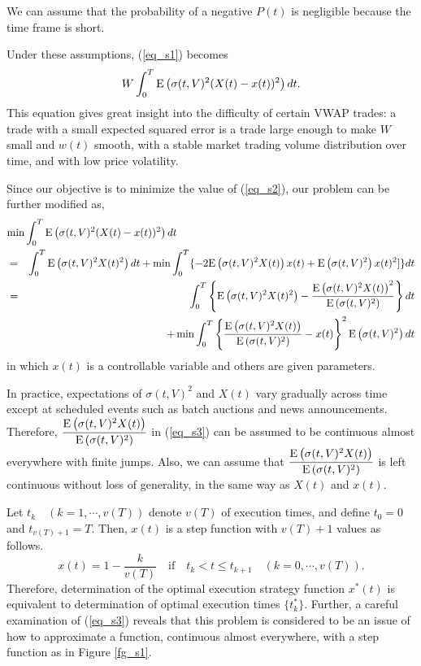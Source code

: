  We can assume that the probability of a negative $P(t)$ is negligible because the time frame is short.

Under these assumptions, (\ref{eq_s1}) becomes
\begin{equation}\label{eq_s2}
  W \int_0^T {\mathrm{E}}\left( \sigma(t,V)^2(X(t)-x(t))^2 \right) dt.
\end{equation}
This equation gives great insight into the difficulty of certain VWAP trades: a trade with a small expected squared error is a trade large enough to make $W$ small and $w(t)$ smooth, with a stable market trading volume distribution over time, and with low price volatility.

Since our objective is to minimize the value of (\ref{eq_s2}), our problem can be further modified as,
\begin{eqnarray}
    \lefteqn{\mbox{min} \int_0^T \ex{\sigma(t,V)^2(X(t)-x(t))^2} dt} \nonumber \\
    & = & \int_0^T \ex{\sigma(t,V)^2X(t)^2}dt+ \min\int_0^T \{-2\ex{\sigma(t,V)^2X(t)}x(t)+ \ex{\sigma(t,V)^2}x(t)^2]\}dt \nonumber \\
    & = & \int_0^T \left\{ \ex{\sigma(t,V)^2X(t)^2}-\frac{\ex{\sigma(t,V)^2X(t)}^2}{\ex{\sigma(t,V)^2}} \right\} dt \nonumber \\
    &   & + \min \int_0^T \left\{ \frac{\ex{\sigma(t,V)^2X(t)}}{\ex{\sigma(t,V)^2}}-x(t)\right\}^2\ex{\sigma(t,V)^2} dt \label{eq_s3}
\end{eqnarray}
in which $x(t)$ is a controllable variable and others are given parameters.

In practice, expectations of $\sigma(t,V)^2$ and $X(t)$ vary gradually across time except at scheduled events such as batch auctions and news announcements.  Therefore, $\displaystyle \frac{{\mathrm{E}}\left( \sigma(t,V)^2X(t) \right)}{{\mathrm{E}}\left( \sigma(t,V)^2 \right)}$ in (\ref{eq_s3}) can be assumed to be continuous almost everywhere with finite jumps.  Also, we can assume that $\displaystyle \frac{{\mathrm{E}}\left( \sigma(t,V)^2X(t) \right)}{{\mathrm{E}}\left( \sigma(t,V)^2 \right)}$ is left continuous without loss of generality, in the same way as $X(t)$ and $x(t)$.

Let $t_k \quad (k=1,\cdots,v(T))$ denote $v(T)$ of execution times, and define $t_0=0$ and $t_{v(T)+1}=T$.  Then, $x(t)$ is a step function with $v(T)+1$ values as follows.
\begin{equation}\label{eq_s4}
  x(t)=1-\frac{k}{v(T)} \quad \mbox{if} \quad t_k < t \leq t_{k+1} \quad (k=0,\cdots,v(T)).
\end{equation}
Therefore, determination of the optimal execution strategy function $x^*(t)$ is equivalent to determination of optimal execution times $\{t_k^*\}$.  Further, a careful examination of (\ref{eq_s3}) reveals that this problem is considered to be an issue of how to approximate a function, continuous almost everywhere, with a step function as in Figure \ref{fg_s1}.

